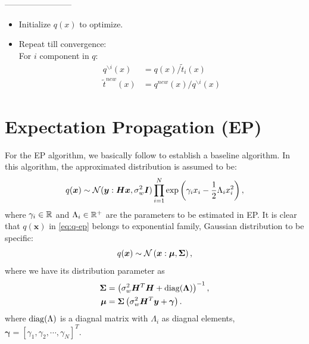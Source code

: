 \documentclass{article}
\DeclarePairedDelimiter{\diagfences}{(}{)}
\newcommand{\diag}{\operatorname{diag}\diagfences}
\begin{document}
------------------------

\begin{itemize}
\item[] Initialize $q(x)$ to optimize.
\item[] Repeat till convergence:\\
  For $i$ component in $q$:
  \begin{align}
    q^{\backslash i}(x) &= q(x) / \tilde{t}_i(x)\\
    \tilde{t}^{new}(x) &= q^{new}(x)/q^{\backslash i}(x)
  \end{align}
\end{itemize}    

\section{Expectation Propagation (EP)} \label{sec:EP}
For the EP algorithm, we basically follow \cite{cespedes2014mimo} to establish a baseline algorithm.
In this algorithm, the approximated distribution is assumed to be:
\begin{equation}\label{eq:q-ep}
  q(\bm{x}) \sim \mathcal{N}(\bm{y}: \bm{H}\bm{x}, \sigma_{w}^2\bm{I}) \prod_{i=1}^{N} \exp\left( \gamma_i x_i - \frac{1}{2}\Lambda_i x_i^2 \right),
\end{equation}
where $\gamma_i \in \mathbb{R}$ and $\Lambda_i \in \mathbb{R}^{+}$ are the parameters to be estimated in EP. It is clear that $q(\bm{x})$ in \eqref{eq:q-ep} belongs to exponential family, Gaussian distribution to be specific:
\begin{equation}
  q(\bm{x}) \sim \mathcal{N}\left(\bm{x}:\bm{\mu}, \bm{\Sigma} \right),
\end{equation}
where we have its distribution parameter as
\begin{align}
  \bm{\Sigma} &= \left( \sigma_{w}^2\bm{H}^{T}\bm{H} +  \diag{\bm{\Lambda}} \right)^{-1}, \\
  \bm{\mu} & = \bm{\Sigma}\left( \sigma_{w}^2\bm{H}^{T}\bm{y} +  \bm{\gamma} \right).
\end{align}
where $\diag{\Lambda}$ is a diagnal matrix with $\Lambda_i$ as diagnal elements, $\bm{\gamma}=[\gamma_1, \gamma_2, \cdots, \gamma_N]^{T}$.
\end{document}
